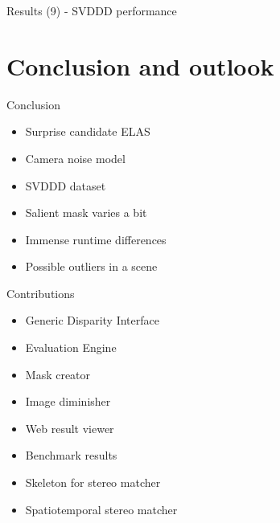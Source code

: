 \documentclass[10pt]{beamer}
\begin{document}
\begin{frame}[fragile]{Results (9) - SVDDD performance}
  \begin{table}
  \centering
  \caption{Result table for general performance of SVDDD (PBMP$_{noc,1px}$)}
  \end{table}
\end{frame}

\section{Conclusion and outlook}

\begin{frame}[fragile]{Conclusion}
  \begin{itemize}
    \item Surprise candidate ELAS
    \item Camera noise model
    \item SVDDD dataset
    \item Salient mask varies a bit
    \item Immense runtime differences
    \item Possible outliers in a scene
  \end{itemize}
\end{frame}

\begin{frame}[fragile]{Contributions}
  \begin{itemize}
    \item Generic Disparity Interface
    \item Evaluation Engine
    \item Mask creator
    \item Image diminisher
    \item Web result viewer
    \item Benchmark results
    \item Skeleton for stereo matcher
    \item Spatiotemporal stereo matcher
  \end{itemize}
\end{frame}
\end{document}
